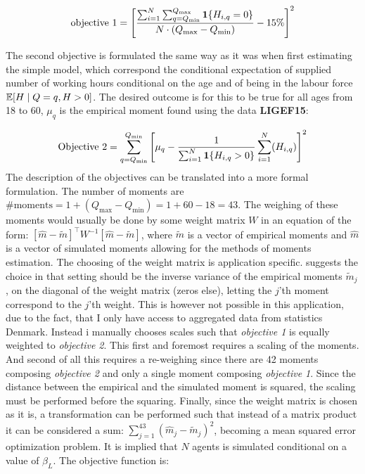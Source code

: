 \begin{equation}
    \text{objective 1} = \left[\frac{\sum_{i=1}^{N} \sum_{q=Q_{\min}}^{Q_{\max}} \mathbf{1}\{H_{i,q} = 0\}}{ N \cdot (Q_{\max} - Q_{\min} )} - 15\% \right]^2
\end{equation}

The second objective is formulated the same way as it was when first estimating the simple model, which correspond the conditional expectation of supplied number of working hours conditional on the age and of being in the labour force $ \mathbb{E}[H \mid Q=q, H>0]$. The desired outcome is for this to be true for all ages from 18 to 60, $\mu_q$ is the empirical moment found using the data \textbf{LIGEF15}:

\begin{equation}
    \text{Objective 2} = \sum_{q=Q_{\min}}^{Q_{\min}} \left[ \mu_q  - \frac{1}{\sum_{i=1}^{N} \mathbf{1}\{H_{i,q} > 0\}}\sum_{i=1}^N (H_{i,q})\right]^2
\end{equation}
The description of the objectives can be translated into a more formal formulation. The number of moments are $\text{\# moments}  = 1 + (Q_{\max} - Q_{\min}) = 1 + 60 - 18 = 43$. The weighing of these moments would usually be done by some weight matrix $W$ in an equation of the form: $[\hat{m} - \tilde{m}]^{\top} W^{-1} [\hat{m} - \tilde{m}]$, where $\tilde{m}$ is a vector of empirical moments and $\hat{m}$ is a vector of simulated moments allowing for the methods of moments estimation. The choosing of the weight matrix is application specific. \textcite{eisenhauer_estimation_2015} suggests the choice in that setting should be the inverse variance of the empirical moments $\tilde{m}_j$, on the diagonal of the weight matrix (zeros else), letting the $j$'th moment correspond to the $j$'th weight. This is however not possible in this application, due to the fact, that I only have access to aggregated data from statistics Denmark. Instead i manually chooses scales such that \textit{objective 1} is equally weighted to \textit{objective 2}. This first and foremost requires a scaling of the moments. And second of all this requires a re-weighing since there are 42 moments composing \textit{objective 2} and only a single moment composing \textit{objective 1}. Since the distance between the empirical and the simulated moment is squared, the scaling must be performed before the squaring. Finally, since the weight matrix is chosen as it is, a transformation can be performed such that instead of a matrix product it can be considered a sum: $\sum_{j = 1}
^{43} ( \hat{m}_j - \tilde{m}_j )^2$, becoming a mean squared error optimization problem. It is implied that $N$ agents is simulated conditional on a value of $\beta_L$. The objective function is:

